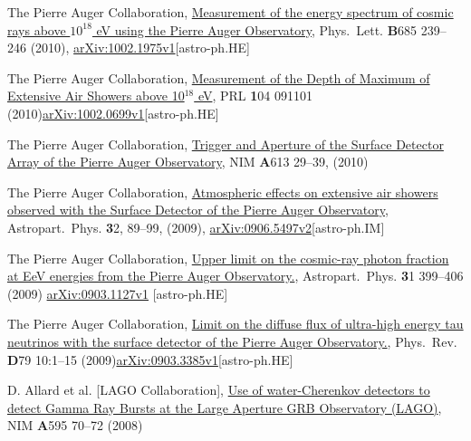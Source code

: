\begin{etaremune}
\item {}The Pierre Auger Collaboration,
\href{http://dx.doi.org/10.1016/j.physletb.2010.02.013}{{Measurement of
the energy spectrum of cosmic rays above $10^{18}$ eV using the Pierre Auger
Observatory}}, Phys.\ Lett. {\textbf B685} 239--246 (2010),
\href{http://arxiv.org/abs/1002.1975}{arXiv:1002.1975v1}[astro-ph.HE]

\item {}The Pierre Auger Collaboration,
\href{http://dx.doi.org/10.1103/PhysRevLett.104.091101}{{Measurement of
the Depth of Maximum of Extensive Air Showers above 10$^{18}$ eV}}, PRL {\textbf
104} 091101
(2010)\href{http://arxiv.org/abs/1002.0699}{arXiv:1002.0699v1}[astro-ph.HE]

\item {}The Pierre Auger Collaboration,
\href{http://dx.doi.org/10.1016/j.nima.2009.11.018}{{Trigger and Aperture
of the Surface Detector Array of the Pierre Auger Observatory}}, NIM {\textbf A613}
29--39, (2010)

\item {} The Pierre Auger Collaboration,
\href{http://dx.doi.org/10.1016/j.astropartphys.2009.06.004}{{Atmospheric
effects on extensive air showers observed with the Surface Detector of the
Pierre Auger Observatory}}, Astropart.\ Phys. {\textbf 32}, 89--99, (2009),
\href{http://arxiv.org/abs/0906.5497/}{arXiv:0906.5497v2}[astro-ph.IM]

\item {}The Pierre Auger Collaboration,
\href{http://dx.doi.org/10.1016/j.astropartphys.2009.04.003}{{Upper limit
on the cosmic-ray photon fraction at EeV energies from the Pierre Auger
Observatory.}}, Astropart.\ Phys. {\textbf 31} 399--406 (2009)
\href{http://arxiv.org/abs/0903.1127/}{arXiv:0903.1127v1} [astro-ph.HE]

\item {}The Pierre Auger Collaboration,
\href{http://dx.doi.org/10.1103/PhysRevD.79.102001}{{Limit on the diffuse
flux of ultra-high energy tau neutrinos with the surface detector of the Pierre
Auger Observatory.}}, Phys.\ Rev. {\textbf D79} 10:1--15
(2009)\href{http://arxiv.org/abs/0903.3385/}{arXiv:0903.3385v1}[astro-ph.HE]

\item {}D. Allard { et al.} [LAGO Collaboration],
\href{http://dx.doi.org/10.1016/j.nima.2008.07.041}{{Use of
water-Cherenkov detectors to detect Gamma Ray Bursts at the Large Aperture GRB
Observatory (LAGO)}}, NIM {\textbf A595} 70--72 (2008)


\end{etaremune}
